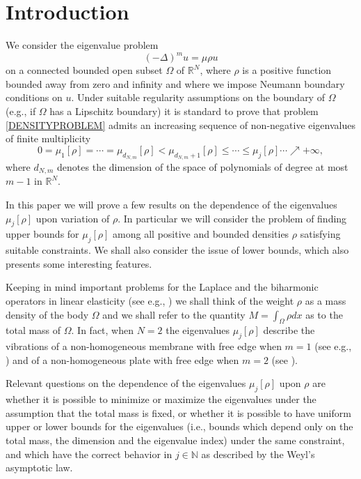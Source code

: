 \documentclass[11pt,a4paper]{amsart}
\numberwithin{equation}{section}
\begin{document}
\section{Introduction}

We consider the eigenvalue problem
\begin{equation}\label{DENSITYPROBLEM}
(-\Delta)^m u =\mu\rho u
\end{equation}
on a connected bounded open subset $\Omega$ of $\mathbb R^N$, where $\rho$ is a positive function bounded away from zero and infinity and where we impose Neumann boundary conditions on $u$. Under suitable regularity assumptions on the boundary of $\Omega$ (e.g., if $\Omega$ has a Lipschitz boundary) it is standard to prove that problem \eqref{DENSITYPROBLEM} admits an increasing sequence of non-negative eigenvalues of finite multiplicity
$$
0=\mu_1[\rho]=\cdots=\mu_{d_{N,m}}[\rho]<\mu_{d_{N,m}+1}[\rho]\leq\cdots\leq\mu_j[\rho]\cdots\nearrow+\infty,
$$
where $d_{N,m}$ denotes the dimension of the space of polynomials of degree at most $m-1$ in $\mathbb R^N$. 

In this paper we will prove a few results on the dependence of the eigenvalues $\mu_j[\rho]$ upon variation of $\rho$. In particular we will consider the problem of finding upper bounds for $\mu_j[\rho]$ among all positive and bounded densities $\rho$ satisfying suitable constraints. We shall also consider the issue of lower bounds, which also presents some interesting features.	


Keeping in mind important problems for the Laplace and the biharmonic operators in linear elasticity (see e.g., \cite{cohil}) we shall think of the weight $\rho$ as a mass density of the body $\Omega$ and we shall refer to the quantity $M=\int_{\Omega}\rho dx$ as to the total mass of $\Omega$. In fact, when $N=2$ the eigenvalues $\mu_j[\rho]$ describe the vibrations of a non-homogeneous membrane with free edge when $m=1$ (see e.g., \cite[\S\,9]{Henrot}) and of a non-homogeneous plate with free edge when $m=2$ (see \cite{buosoprovenzano,chasman}).

Relevant questions on the dependence of the eigenvalues $\mu_j[\rho]$ upon $\rho$ are whether it is possible to minimize or maximize the eigenvalues under the assumption that the total mass is fixed, or whether it is possible to have uniform upper or lower bounds for the eigenvalues (i.e., bounds which depend only on the total mass, the dimension and the eigenvalue index) under the same constraint, and which have the correct behavior in $j\in\mathbb N$ as described by the Weyl's asymptotic law. 
\end{document}
